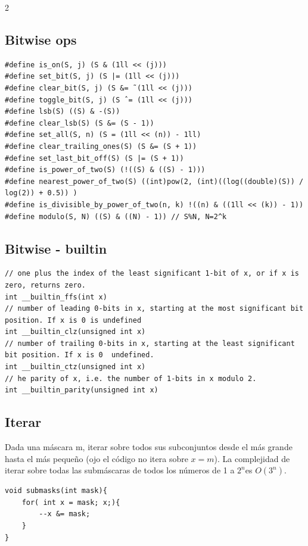 \documentclass[10pt,spanish,mexico]{article}
\numberwithin{equation}{section}
\begin{document}
\begin{multicols}{2}
\subsection{Bitwise ops}
\begin{verbatim}
#define is_on(S, j) (S & (1ll << (j)))
#define set_bit(S, j) (S |= (1ll << (j)))
#define clear_bit(S, j) (S &= ˜(1ll << (j)))
#define toggle_bit(S, j) (S ˆ= (1ll << (j)))
#define lsb(S) ((S) & -(S))
#define clear_lsb(S) (S &= (S - 1))
#define set_all(S, n) (S = (1ll << (n)) - 1ll)
#define clear_trailing_ones(S) (S &= (S + 1))
#define set_last_bit_off(S) (S |= (S + 1))
#define is_power_of_two(S) (!((S) & ((S) - 1)))
#define nearest_power_of_two(S) ((int)pow(2, (int)((log((double)(S)) / log(2)) + 0.5)) )
#define is_divisible_by_power_of_two(n, k) !((n) & ((1ll << (k)) - 1))
#define modulo(S, N) ((S) & ((N) - 1)) // S%N, N=2^k
\end{verbatim}

\vspace{-0.7\baselineskip}
\hrulefill
\subsection{Bitwise - builtin}
\begin{verbatim}
// one plus the index of the least significant 1-bit of x, or if x is zero, returns zero.
int __builtin_ffs(int x)
// number of leading 0-bits in x, starting at the most significant bit position. If x is 0 is undefined
int __builtin_clz(unsigned int x)
// number of trailing 0-bits in x, starting at the least significant bit position. If x is 0  undefined.
int __builtin_ctz(unsigned int x)
// he parity of x, i.e. the number of 1-bits in x modulo 2.
int __builtin_parity(unsigned int x)
\end{verbatim}

\vspace{-1.2\baselineskip}
\hrulefill
\subsection{Iterar}
Dada una máscara m, iterar sobre todos sus subconjuntos desde el más grande hasta el más pequeño (ojo el código no itera sobre $x=m$). La complejidad de iterar sobre todas las submáscaras de todos los números de 1 a $2^n $es $O(3^n)$.
\begin{verbatim}
void submasks(int mask){
    for( int x = mask; x;){
        --x &= mask;
    }
}
\end{verbatim}


\end{multicols}
\end{document}
